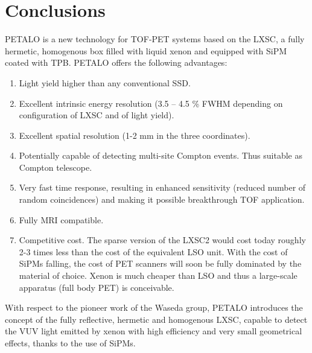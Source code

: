 \documentclass[12pt,a4paper,english,twoside]{article}
\begin{document}










%

\section{Conclusions}
\label{sec.conclu}

PETALO is a new technology for TOF-PET systems based on the LXSC, a fully hermetic, homogenous box filled with liquid xenon and equipped with SiPM coated with TPB. PETALO offers the following advantages:

\begin{enumerate}
\item Light yield higher than any conventional SSD.
\item Excellent intrinsic energy resolution (3.5 -- 4.5 \% FWHM depending on configuration of LXSC and of light yield). 
\item Excellent spatial resolution (1-2 mm in the three coordinates).
\item Potentially capable of detecting multi-site Compton events. Thus suitable as Compton telescope.
\item Very fast time response, resulting in enhanced sensitivity (reduced number of random coincidences) and making it possible breakthrough TOF application. 
\item Fully MRI compatible. 
\item Competitive cost. The sparse version of the LXSC2 would cost today roughly 2-3 times less than the cost of the equivalent LSO unit. With the cost of SiPMs falling, the  cost of PET scanners will soon be fully dominated by the material of choice. Xenon is much cheaper than LSO and thus a large-scale apparatus (full body PET) is conceivable. 
\end{enumerate}

With respect to the pioneer work of the Waseda group, PETALO introduces the concept of the fully reflective, hermetic and homogenous LXSC, capable to detect the VUV light emitted by xenon with high efficiency and very small geometrical effects, thanks to the use of SiPMs. 

\end{document}
